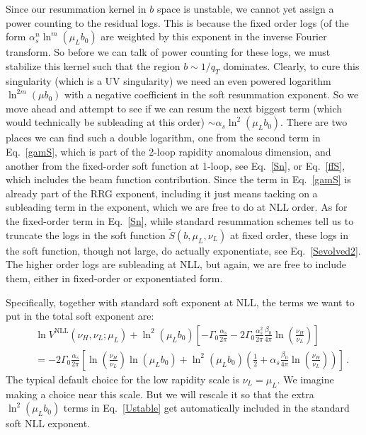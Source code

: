 \documentclass[a4,letterpaper,11pt]{article}
\newcommand{\nn}{\nonumber}
\newcommand{\bea}{\begin{eqnarray}}
\newcommand{\eea}{\end{eqnarray}}
\newcommand{\as}{\alpha_s}
\newcommand{\wt}{\widetilde}
\newcommand{\eq}[1]{Eq.~\eqref{#1}}
\begin{document}
Since our resummation kernel in $b$ space is unstable, we cannot yet assign a power counting to the residual logs. This is because the fixed order logs (of the form $\as^n \ln^m(\mu_L b_0)$ are weighted by this exponent in the inverse Fourier transform. So before we can talk of power counting for these logs, we must stabilize this kernel such that the region $b \sim 1/q_T$ dominates.
 Clearly, to cure this singularity (which is a UV singularity) we need an even powered logarithm $\ln^{2m}(\mu b_0)$ with a negative coefficient in the soft resummation exponent.  
 So we move ahead and attempt to see if we can resum the next biggest term (which would technically be subleading at this order) $\sim\as \ln^2(\mu_L b_0)$.  There are two places we can find such a double logarithm, one from the second term in \eq{gamS}, which is part of the 2-loop rapidity anomalous dimension, and another from the fixed-order soft function at 1-loop, see \eq{Sn}, or \eq{ffS}, which includes the beam function contribution. Since the term in \eq{gamS} is already part of the RRG exponent, including it just means tacking on a subleading term in the exponent, which we are free to do at NLL order. As for the fixed-order term in \eq{Sn}, while standard resummation schemes tell us to truncate the logs in the soft function $\wt S(b,\mu_L,\nu_L)$ at fixed order, these logs in the soft function, though not large, do actually exponentiate, see \eq{Sevolved2}.  The higher order logs are subleading at NLL, but again, we are free to include them, either in fixed-order or exponentiated form. 
 
 
Specifically, together with standard soft exponent at NLL, the terms we want to put in the total soft exponent are:
\bea
 &&\ln V^\text{NLL}(\nu_H,\nu_L; \mu_L)
  + \ln^2(\mu_L b_0)\left[ -\Gamma_0\frac{\as}{2\pi}-2\Gamma_0\frac{\as^2}{2\pi} \frac{\beta_0}{4\pi} \ln\left(\frac{\nu_H}{\nu_L}\right)\right]   
\nn \\
 &&=-2\Gamma_0\frac{\as}{2\pi}
 \left[\ln\left(\frac{\nu_H}{\nu_L}\right)\ln(\mu_L b_0)+\ln^2(\mu_L b_0)\left(\frac{1}{2}+ \as \frac{\beta_0}{4\pi} \ln\left(\frac{\nu_H}{\nu_L}\right)\right) \right]\,.
\label{Ustable}
\eea
The typical default choice for the low rapidity scale is $\nu_L = \mu_L$. We imagine making a choice near this scale. But we will rescale it so that the extra $\ln^2(\mu_L b_0)$ terms in \eq{Ustable} get automatically included in the standard soft NLL exponent. 
\end{document}
